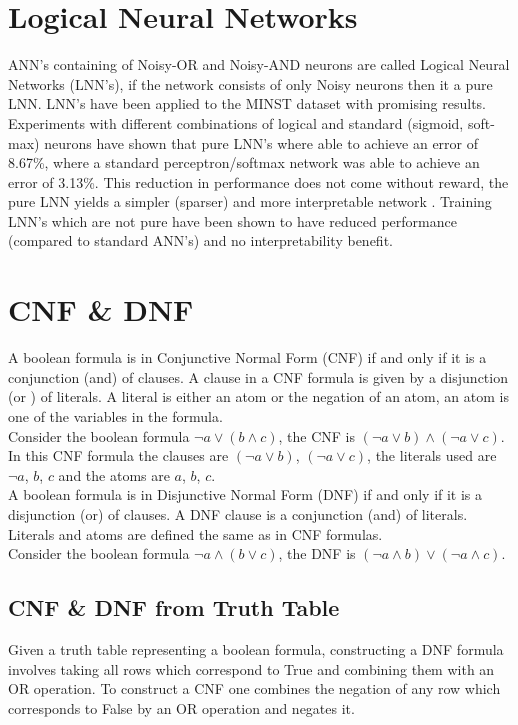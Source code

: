\section{Logical Neural Networks}
ANN's containing of Noisy-OR and Noisy-AND neurons are called Logical Neural Networks (LNN's), if the network consists of only Noisy neurons then it a pure LNN. LNN's have been applied to the MINST dataset with promising results. Experiments with different combinations of logical and standard (sigmoid, soft-max) neurons have shown that pure LNN's where able to achieve an error of 8.67\%, where a standard perceptron/softmax network was able to achieve an error of 3.13\%. This reduction in performance does not come without reward, the pure LNN yields a simpler (sparser) and more interpretable network \cite{LearningLogicalActivations}. Training LNN's which are not pure have been shown to have reduced performance (compared to standard ANN's) and no interpretability benefit.\\

\section{CNF \& DNF}
A boolean formula is in Conjunctive Normal Form (CNF) if and only if it is a conjunction (and) of clauses. A clause in a CNF formula is given by a disjunction (or ) of literals. A literal is either an atom or the negation of an atom, an atom is one of the variables in the formula.\\

Consider the boolean formula $\lnot a \lor (b \land c)$, the CNF is $(\lnot a \lor b) \land (\lnot a \lor c)$. In this CNF formula the clauses are $(\lnot a \lor b)$, $(\lnot a \lor c)$, the literals used are $\lnot a$, $b$, $c$ and the atoms are $a$, $b$, $c$.\\

A boolean formula is in Disjunctive Normal Form (DNF) if and only if it is a disjunction (or) of clauses. A DNF clause is a conjunction (and) of literals. Literals and atoms are defined the same as in CNF formulas.\\

Consider the boolean formula $\lnot a \land (b \lor c)$, the DNF is $(\lnot a \land b) \lor (\lnot a \land c)$.\\

\subsection{CNF \& DNF from Truth Table} \label{subsec:construct-cnfdnf}
Given a truth table representing a boolean formula, constructing a DNF formula involves taking all rows which correspond to True and combining them with an OR operation. To construct a CNF one combines the negation of any row which corresponds to False by an OR operation and negates it.

